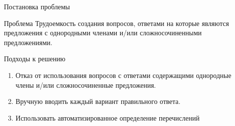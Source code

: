 \documentclass[10pt,ps,serif,mathserif]{beamer}
\begin{document}
    \begin{frame}{Постановка проблемы}
        \begin{block}{Проблема}
            Трудоемкость создания вопросов, ответами на которые являются предложения с однородными членами и/или сложносочиненными предложениями.
        \end{block}

        \begin{block}{Подходы к решению}
            \begin{enumerate}
                \item Отказ от использования вопросов с ответами содержащими однородные члены и/или сложносочиненные предложения.
                \item Вручную вводить каждый вариант правильного ответа.
                \item {\color{magenta} Использовать автоматизированное определение перечислений}
            \end{enumerate}
        \end{block}
    \end{frame}
\end{document}
